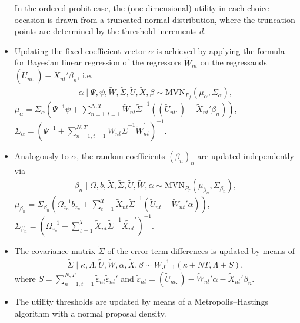 \documentclass[article,shortnames]{jss}
\begin{document}
\begin{itemize}
  In the ordered probit case, the (one-dimensional) utility in each choice occasion is drawn from a truncated normal distribution, where the truncation points are determined by the threshold increments $d$.
  \item Updating the fixed coefficient vector $\alpha$ is achieved by applying the formula for Bayesian linear regression of the regressors $\tilde{W}_{nt}$ on the regressands $(\tilde{U}_{nt:})-\tilde{X}_{nt}'\beta_n$, i.e.\
  \begin{align*}
  \alpha \mid \Psi,\psi,\tilde{W},\tilde{\Sigma},\tilde{U},\tilde{X},\beta \sim \text{MVN}_{P_f}(\mu_\alpha,\Sigma_\alpha),
  \end{align*}
  $\mu_\alpha = \Sigma_\alpha (\Psi^{-1}\psi + \sum_{n=1,t=1}^{N,T} \tilde{W}_{nt} \tilde{\Sigma}^{-1} ((\tilde{U}_{nt:})-\tilde{X}_{nt}'\beta_n) )$, $\Sigma_\alpha = (\Psi^{-1} + \sum_{n=1,t=1}^{N,T} \tilde{W}_{nt}\tilde{\Sigma}^{-1} \tilde{W}_{nt}^{'} )^{-1}$.
  \item Analogously to $\alpha$, the random coefficients $(\beta_n)_n$ are updated independently via
  \begin{align*}
  \beta_n \mid \Omega,b,\tilde{X},\tilde{\Sigma},\tilde{U},\tilde{W},\alpha \sim \text{MVN}_{P_r}(\mu_{\beta_n},\Sigma_{\beta_n}),
  \end{align*}
  $\mu_{\beta_n} = \Sigma_{\beta_n} (\Omega_{z_n}^{-1}b_{z_n} + \sum_{t=1}^{T} \tilde{X}_{nt} \tilde{\Sigma}^{-1} (\tilde{U}_{nt}-\tilde{W}_{nt}'\alpha) )$, $\Sigma_{\beta_n} = (\Omega_{z_n}^{-1} + \sum_{t=1}^{T} \tilde{X}_{nt}\tilde{\Sigma}^{-1} \tilde{X_{nt}}^{'} )^{-1}$.
    \item The covariance matrix $\tilde{\Sigma}$ of the error term differences is updated by means of
  \begin{align*}
  \tilde{\Sigma} \mid \kappa,\Lambda,\tilde{U},\tilde{W},\alpha,\tilde{X},\beta \sim W^{-1}_{J-1}(\kappa+NT,\Lambda+S),
  \end{align*}
  where $S = \sum_{n=1,t=1}^{N,T} \tilde{\varepsilon}_{nt} \tilde{\varepsilon}_{nt}'$ and $\tilde{\varepsilon}_{nt} = (\tilde{U}_{nt:}) - \tilde{W}_{nt}'\alpha - \tilde{X}_{nt}'\beta_n$.
  \item The utility thresholds \code{d} are updated by means of a Metropolis–Hastings algorithm with a normal proposal density.
\end{itemize}
\end{document}
